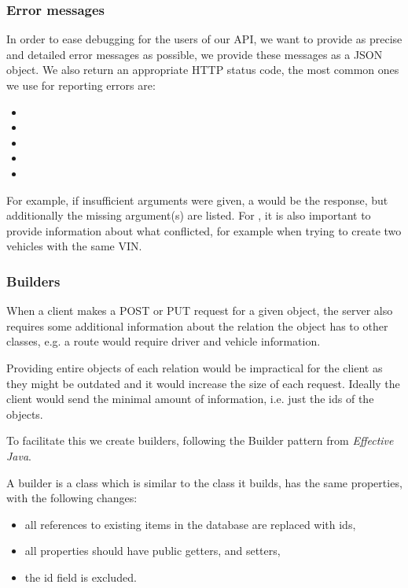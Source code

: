 \subsubsection{Error messages}
In order to ease debugging for the users of our API, we want to provide as precise and detailed error messages as possible,
we provide these messages as a JSON object.
We also return an appropriate HTTP status code, the most common ones we use for reporting errors are:
\begin{multicols}{3}
\begin{itemize}
    \item {}
    \item {}
    \item {}
    \item {}
    \item {}
\end{itemize}
\end{multicols}

For example, if insufficient arguments were given, a  would be the response,
but additionally the missing argument(s) are listed.
For , it is also important to provide information about what conflicted,
for example when trying to create two vehicles with the same VIN.

\subsubsection{Builders}\label{par:builders}
When a client makes a POST or PUT request for a given object,
the server also requires some additional information about the relation the object has to other classes,
e.g. a route would require driver and vehicle information.

Providing entire objects of each relation would be impractical for the client as they might be outdated and it would increase the size of each request.
Ideally the client would send the minimal amount of information, i.e. just the ids of the objects.

To facilitate this we create builders, following the Builder pattern from \textit{Effective Java}\cite{Bloch:2008:EJ:1377533}. %

\bigskip
A builder is a class which is similar to the class it builds, has the same properties, with the following changes:
\begin{itemize}
    \item all references to existing items in the database are replaced with ids,
    \item all properties should have public getters, and setters,
    \item the id field is excluded.
\end{itemize}


